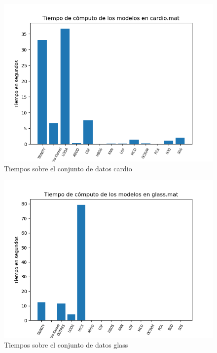 \begin{figure}[H]
	\centering
	\label{cardio_times}
	\includegraphics[scale=0.7]{imagenes/imgs-exp1/times/cardio}
	\caption{Tiempos sobre el conjunto de datos cardio}
\end{figure}

\begin{figure}[H]
	\centering
	\label{glass_times}
	\includegraphics[scale=0.7]{imagenes/imgs-exp1/times/glass}
	\caption{Tiempos sobre el conjunto de datos glass}
\end{figure}

